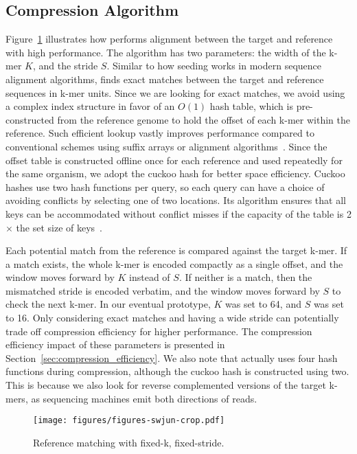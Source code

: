 \subsection{Compression Algorithm}

Figure~\ref{fig:fixed-width} illustrates how \name{} performs alignment between the target and reference with high performance.
The algorithm has two parameters: the width of the k-mer $K$, and the stride $S$.
Similar to how seeding works in modern sequence alignment algorithms, \name{} finds exact matches between the target and reference sequences in k-mer units.
Since we are looking for exact matches, we avoid using a complex index structure in favor of an $O(1)$ hash table, which is pre-constructed from the reference genome to hold the offset of each k-mer within the reference.
Such efficient lookup vastly improves \name{} performance compared to conventional schemes using suffix arrays or alignment algorithms~\cite{chen2023efficientsequencingcompressionfpga,arram2015fpgareferencecompressiongenomic}.
Since the offset table is constructed offline once for each reference and used repeatedly for the same organism, we adopt the cuckoo hash for better space efficiency.
Cuckoo hashes use two hash functions per query, so each query can have a choice of avoiding conflicts by selecting one of two locations.
Its algorithm ensures that all keys can be accommodated without conflict misses if the capacity of the table is 2$\times$ the set size of keys~\cite{pagh2004cuckoo}.

Each potential match from the reference is compared against the target k-mer.
If a match exists, the whole k-mer is encoded compactly as a single offset, and the window moves forward by $K$ instead of $S$.
If neither is a match, then the mismatched stride is encoded verbatim, and the window moves forward by $S$ to check the next k-mer. 
In our eventual prototype, $K$ was set to 64, and $S$ was set to 16. 
Only considering exact matches and having a wide stride can potentially trade off compression efficiency for higher performance.
The compression efficiency impact of these parameters is presented in Section~\ref{sec:compression_efficiency}.
We also note that \name{} actually uses four hash functions during compression, although the cuckoo hash is constructed using two.
This is because we also look for reverse complemented versions of the target k-mers, as sequencing machines emit both directions of reads.

\begin{figure}[htb]
    \centering
    \texttt{[image: figures/figures-swjun-crop.pdf]}
    \caption{Reference matching with fixed-k, fixed-stride.}
    \label{fig:fixed-width}
\end{figure}

